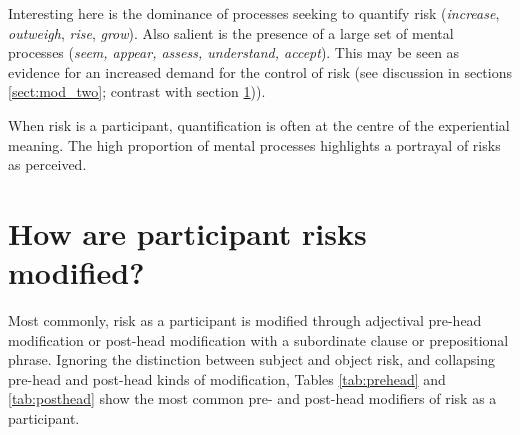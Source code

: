     Interesting here is the dominance of processes seeking to quantify risk (\emph{increase}, \emph{outweigh}, \emph{rise}, \emph{grow}). Also salient is the presence of a large set of mental processes (\emph{seem, appear, assess, understand, accept}). This may be seen as evidence for an increased demand for the control of risk (see discussion in sections \ref{sect:mod_two}; contrast with section \ref{sect:highpotential})).


    \vspace{5mm}\noindent\begin{tcolorbox}[colback=yellow!5,colframe=yellow!40!black,title=Summary: processes with risk participants]
    \parbox{1\textwidth}{%
    When risk is a participant, quantification is often at the centre of the experiential meaning. The high proportion of mental processes highlights a portrayal of risks as perceived.}
    \end{tcolorbox}
    \vspace{5mm}

\section{How are participant risks modified?} \label{sect:highpotential} \FloatBarrier

    Most commonly, risk as a participant is modified through adjectival pre-head modification or post-head modification with a subordinate clause or prepositional phrase. Ignoring the distinction between subject and object risk, and collapsing pre-head and post-head kinds of modification, Tables \ref{tab:prehead} and \ref{tab:posthead} show the most common pre- and post-head modifiers of risk as a participant.


